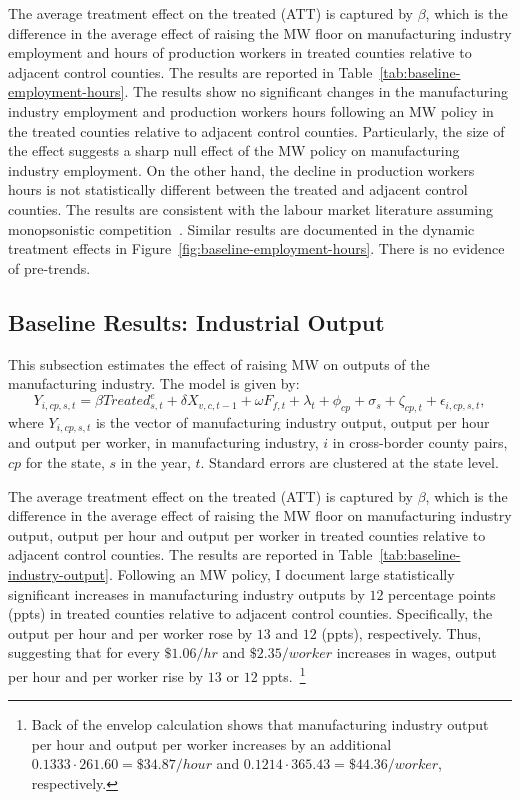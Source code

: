 \documentclass[12pt, english]{article}
\begin{document}
    The average treatment effect on the treated (ATT) is captured by $\beta$, which is the difference in the average effect of raising the MW floor on manufacturing industry employment and hours of production workers in treated counties relative to adjacent control counties. The results are reported in Table~\ref{tab:baseline-employment-hours}. The results show no significant changes in the manufacturing industry employment and production workers hours following an MW policy in the treated counties relative to adjacent control counties. Particularly, the size of the effect suggests a sharp null effect of the MW policy on manufacturing industry employment. On the other hand, the decline in production workers hours is not statistically different between the treated and adjacent control counties. The results are consistent with the labour market literature assuming monopsonistic competition~\parencite{card2000minimum, aaronson2018industry, cengiz2019effect, wong2019minimum, dustmann2022reallocation}. Similar results are documented in the dynamic treatment effects in Figure~\ref{fig:baseline-employment-hours}. There is no evidence of pre-trends.
    

    \subsection{Baseline Results: Industrial Output}\label{subsec:baseline-results-industrial-output}
    This subsection estimates the effect of raising MW on outputs of the manufacturing industry. The model is given by:
    \begin{equation}
        Y_{i,cp,s,t} = \beta Treated_{s,t}^e + \delta X_{v,c,t-1} + \omega F_{f,t} + \lambda_{t} + \phi_{cp} + \sigma_{s} + \zeta_{cp,t} + \epsilon_{i,cp,s,t},\label{eq:baseline-output}
    \end{equation}
    where $Y_{i,cp,s,t}$ is the vector of manufacturing industry output, output per hour and output per worker, in manufacturing industry, $i$ in cross-border county pairs, $cp$ for the state, $s$ in the year, $t$. Standard errors are clustered at the state level.
    

    The average treatment effect on the treated (ATT) is captured by $\beta$, which is the difference in the average effect of raising the MW floor on manufacturing industry output, output per hour and output per worker in treated counties relative to adjacent control counties. The results are reported in Table~\ref{tab:baseline-industry-output}. Following an MW policy, I document large statistically significant increases in manufacturing industry outputs by $12$ percentage points (ppts) in treated counties relative to adjacent control counties. Specifically, the output per hour and per worker rose by $13$ and $12$ (ppts), respectively. Thus, suggesting that for every $\$1.06/hr$ and $\$2.35/worker$ increases in wages, output per hour and per worker rise by $13$ or $12$ ppts.~\footnote{\tiny Back of the envelop calculation shows that manufacturing industry output per hour and output per worker increases by an additional $0.1333 \cdot 261.60 = \$34.87/hour$ and $0.1214 \cdot 365.43 = \$44.36/worker$, respectively.}
\end{document}
